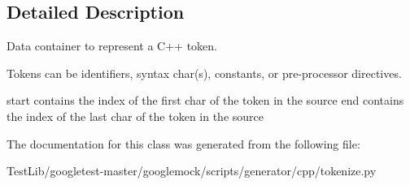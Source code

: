 \subsection{Detailed Description}
\begin{DoxyVerb}Data container to represent a C++ token.

Tokens can be identifiers, syntax char(s), constants, or
pre-processor directives.

start contains the index of the first char of the token in the source
end contains the index of the last char of the token in the source
\end{DoxyVerb}
 

The documentation for this class was generated from the following file\+:\begin{DoxyCompactItemize}
\item 
Test\+Lib/googletest-\/master/googlemock/scripts/generator/cpp/tokenize.\+py\end{DoxyCompactItemize}
